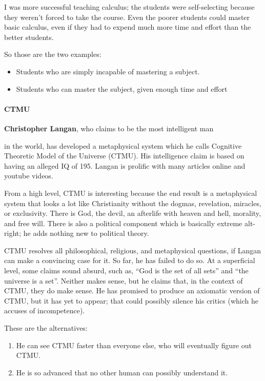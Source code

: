 I was more successful teaching calculus; the students were self-selecting because they weren't forced to take the course. Even the poorer students could master basic calculus, even if they had to expend much more time and effort than the better students.

So those are the two examples:

\begin{itemize}


\item Students who are simply incapable of mastering a subject.

\item Students who can master the subject, given enough time and effort
\end{itemize}


\paragraph{CTMU}


\textbf{Christopher Langan}, who claims to be the most intelligent man

in the world, has developed a metaphysical system which he calls Cognitive Theoretic Model of the Universe (CTMU). His intelligence claim is based on having an alleged IQ of 195. Langan is prolific with many articles online and youtube videos.

From a high level, CTMU is interesting because the end result is a metaphysical system that looks a lot like Christianity without the dogmas, revelation, miracles, or exclusivity. There is God, the devil, an afterlife with heaven and hell, morality, and free will. There is also a political component which is basically extreme alt-right; he adds nothing new to political theory.

CTMU resolves all philosophical, religious, and metaphysical questions, if Langan can make a convincing case for it. So far, he has failed to do so. At a superficial level, some claims sound absurd, such as, ``God is the set of all sets'' and ``the universe is a set''. Neither makes sense, but he claims that, in the context of CTMU, they do make sense. He has promised to produce an axiomatic version of CTMU, but it has yet to appear; that could possibly silence his critics (which he accuses of incompetence).

These are the alternatives:

\begin{enumerate}


\item He can see CTMU faster than everyone else, who will eventually figure out CTMU.

\item He is so advanced that no other human can possibly understand it.
\end{enumerate}


